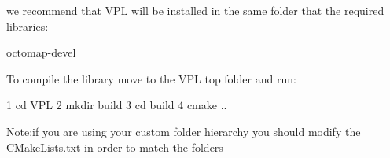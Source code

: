 we recommend that V\+PL will be installed in the same folder that the required libraries\+:


\begin{DoxyItemize}
\item octomap-\/devel
\end{DoxyItemize}

To compile the library move to the V\+PL top folder and run\+:


\begin{DoxyCode}
1 cd VPL
2 mkdir build
3 cd build    
4 cmake ..
\end{DoxyCode}
 {\ttfamily Note\+:if you are using your custom folder hierarchy you should modify the C\+Make\+Lists.\+txt in order to match the folders} 